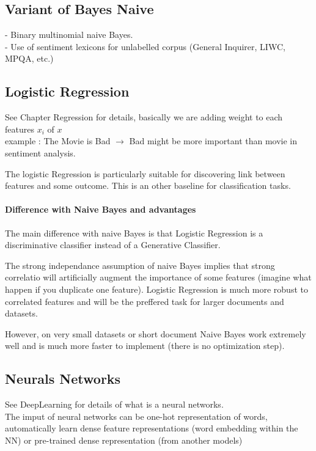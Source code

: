 			\subsection{Variant of Bayes Naive}
				- Binary multinomial naive Bayes.\\
				- Use of sentiment lexicons for unlabelled corpus (General Inquirer, LIWC, MPQA, etc.)
		\subsection{Logistic Regression}

			See Chapter Regression for details, basically we are adding weight to each features $x_i$ of $x$ \\
			example : The Movie is Bad $\rightarrow$ Bad might be more important than movie in sentiment analysis.

			The logistic Regression is particularly suitable for discovering link between features and some outcome. This is an other baseline for classification tasks. 

			\paragraph*{Difference with Naive Bayes and advantages}
			The main difference with naive Bayes is that Logistic Regression is a discriminative classifier instead of a Generative Classifier.

			The strong independance assumption of naive Bayes implies that strong correlatio will artificially augment the importance of some features (imagine what happen if you duplicate one feature). Logistic Regression is much more robust to correlated features and will be the preffered task for larger documents and datasets.

			However, on very small datasets or short document Naive Bayes work extremely well and is much more faster to implement (there is no optimization step).
				
		\subsection{Neurals Networks}
			See DeepLearning for details of what is a neural networks. \\

			The imput of neural networks can be one-hot representation of words, automatically learn dense feature representations (word embedding within the NN) or pre-trained dense representation (from another models)

